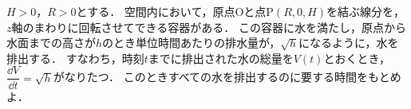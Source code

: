 $H>0$，$R>0$とする．
空間内において，原点$\mathrm{O}$と点$\mathrm{P}(R,0,H)$を結ぶ線分を，$z$軸のまわりに回転させてできる容器がある．
この容器に水を満たし，原点から水面までの高さが$h$のとき単位時間あたりの排水量が，$\sqrt{h}$になるように，水を排出する．
すなわち，時刻$t$までに排出された水の総量を$V(t)$とおくとき，$\dfrac{\dd V}{\dd t}=\sqrt{h}$がなりたつ．
このときすべての水を排出するのに要する時間をもとめよ．
